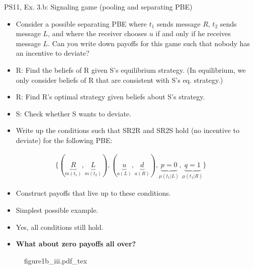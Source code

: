 \begin{frame}{PS11, Ex. 3.b: Signaling game (pooling and separating PBE)}
    \begin{itemize}
        \item[(b)] Consider a possible separating PBE where $t_1$ sends message $R$, $t_2$ sends message $L$, and where the receiver chooses $u$ if and only if he receives message $L$. Can you write down payoffs for this game such that nobody has an incentive to deviate?
    \end{itemize} \vspace{-8pt}
    \begin{multicols}{2}
      \begin{itemize}
        \item[SR3:] R: Find the beliefs of R given S's equilibrium strategy. (In equilibrium, we only consider beliefs of R that are consistent with S's eq. strategy.)
        \item[SR2R:] R: Find R's optimal strategy given beliefs about S's strategy.
        \item[SR2S:] S: Check whether S wants to deviate.
        \item[PBE:]  Write up the conditions such that SR2R and SR2S hold (no incentive to deviate) for the following PBE:
      \end{itemize}\vspace{-14pt}
      \begin{align*}
        \{(\underbrace{R}_{m(t_1)},\underbrace{L}_{m(t_2)}),(\underbrace{u}_{a(L)},\underbrace{d}_{a(R)}),\underbrace{p=0}_{\mu(t_1|L)},\underbrace{q=1}_{\mu(t_1|R)}\}
      \end{align*}\vspace{-12pt}
      \begin{itemize}
        \item[$\rightarrow$] Construct payoffs that live up to these conditions.
        \item[i:] Simplest possible example.
        \item[ii:] Yes, all conditions still hold.
        \item[iii:] \textbf{What about zero payoffs all over?}
      \end{itemize}
      \vfill\null\columnbreak
      \begin{figure}[!h]
        \center{}
        {figure1b_iii.pdf_tex}
      \end{figure} \vspace{-8pt}
      \begin{itemize}

\end{itemize}
\end{multicols}
\end{frame}
